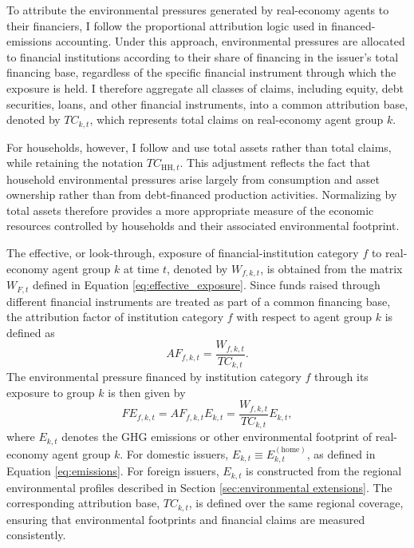 To attribute the environmental pressures generated by real-economy agents to their financiers, I follow the proportional attribution logic used in financed-emissions accounting. Under this approach, environmental pressures are allocated to financial institutions according to their share of financing in the issuer's total financing base, regardless of the specific financial instrument through which the exposure is held. I therefore aggregate all classes of claims, including equity, debt securities, loans, and other financial instruments, into a common attribution base, denoted by $TC_{k,t}$, which represents total claims on real-economy agent group $k$.

For households, however, I follow \textcite{jondeau_environmental_2026} and use total assets rather than total claims, while retaining the notation $TC_{\mathrm{HH},t}$. This adjustment reflects the fact that household environmental pressures arise largely from consumption and asset ownership rather than from debt-financed production activities. Normalizing by total assets therefore provides a more appropriate measure of the economic resources controlled by households and their associated environmental footprint.

The effective, or look-through, exposure of financial-institution category $f$ to real-economy agent group $k$ at time $t$, denoted by $W_{f,k,t}$, is obtained from the matrix $W_{F,t}$ defined in Equation \ref{eq:effective_exposure}. Since funds raised through different financial instruments are treated as part of a common financing base, the attribution factor of institution category $f$ with respect to agent group $k$ is defined as
\begin{equation}
AF_{f,k,t} = \frac{W_{f,k,t}}{TC_{k,t}}.
\end{equation}
The environmental pressure financed by institution category $f$ through its exposure to group $k$ is then given by
\begin{equation}
FE_{f,k,t} = AF_{f,k,t} E_{k,t}
= \frac{W_{f,k,t}}{TC_{k,t}} E_{k,t},
\end{equation}
where $E_{k,t}$ denotes the GHG emissions or other environmental footprint of real-economy agent group $k$. For domestic issuers, $E_{k,t} \equiv E_{k,t}^{(\mathrm{home})}$, as defined in Equation \ref{eq:emissions}. For foreign issuers, $E_{k,t}$ is constructed from the regional environmental profiles described in Section \ref{sec:environmental extensions}. The corresponding attribution base, $TC_{k,t}$, is defined over the same regional coverage, ensuring that environmental footprints and financial claims are measured consistently.

